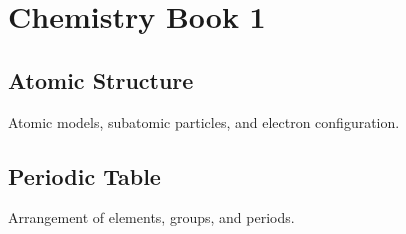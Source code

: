 \chapter{Chemistry Book 1}

\section{Atomic Structure}
Atomic models, subatomic particles, and electron configuration.

\section{Periodic Table}
Arrangement of elements, groups, and periods.
